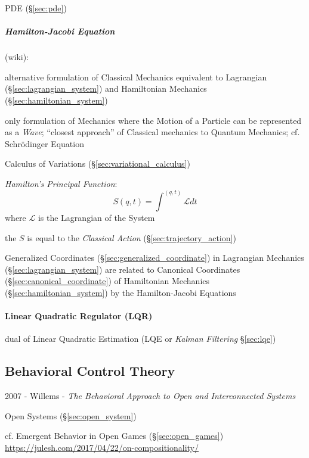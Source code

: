 PDE (\S\ref{sec:pde})



\subparagraph{Hamilton-Jacobi Equation}\label{sec:hamilton_jacobi}\hfill

(wiki):

alternative formulation of Classical Mechanics equivalent to Lagrangian
(\S\ref{sec:lagrangian_system}) and Hamiltonian Mechanics
(\S\ref{sec:hamiltonian_system})

only formulation of Mechanics where the Motion of a Particle can be represented
as a \emph{Wave}; ``closest approach'' of Classical mechanics to Quantum
Mechanics; cf. Schr\"odinger Equation

\fist Calculus of Variations (\S\ref{sec:variational_calculus})

\emph{Hamilton's Principal Function}:
\[
  S(q,t) = \int^{(q,t)} \mathcal{L} dt
\]
where $\mathcal{L}$ is the Lagrangian of the System

the $S$ is equal to the \emph{Classical Action} (\S\ref{sec:trajectory_action})

Generalized Coordinates (\S\ref{sec:generalized_coordinate}) in Lagrangian
Mechanics (\S\ref{sec:lagrangian_system}) are related to Canonical Coordinates
(\S\ref{sec:canonical_coordinate}) of Hamiltonian Mechanics
(\S\ref{sec:hamiltonian_system}) by the Hamilton-Jacobi Equations



\paragraph{Linear Quadratic Regulator (LQR)}\label{sec:lqr}\hfill

dual of Linear Quadratic Estimation (LQE or \emph{Kalman Filtering}
\S\ref{sec:lqe})



\subsection{Behavioral Control Theory}\label{sec:behavioral_control}

2007 - Willems - \emph{The Behavioral Approach to Open and Interconnected
  Systems}

\fist Open Systems (\S\ref{sec:open_system})

\fist cf. Emergent Behavior in Open Games (\S\ref{sec:open_games})
\url{https://julesh.com/2017/04/22/on-compositionality/}

